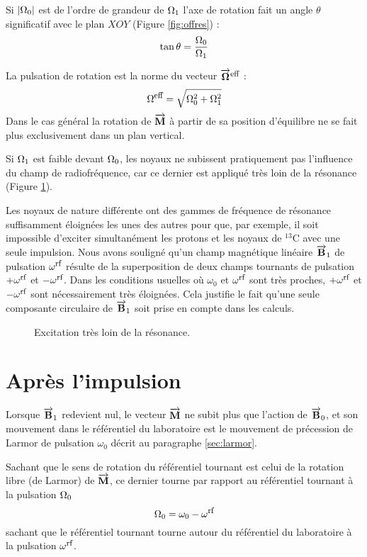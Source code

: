 Si $|\Omega_0|$
 est de l'ordre de grandeur de $\Omega_1$
l'axe de rotation fait un angle $\theta$ significatif avec le plan
$XOY$ (Figure \ref{fig:offres}) :
\begin{equation}
\tan \theta =  \frac{\Omega_0}{\Omega_1}
\end{equation}

La pulsation de rotation est la norme du vecteur $\overrightarrow{\mathbf{\Omega}}^{\mbox{\footnotesize{eff}}}$ :
\begin{equation}
\Omega^{\mbox{\footnotesize{eff}}} = \sqrt{\Omega_0^2 + \Omega_1^2}
\end{equation}
Dans le cas général la rotation de $\overrightarrow{\mathbf{M}}$ à partir de sa position d'équilibre
ne se fait plus exclusivement dans un plan vertical.

Si $\Omega_1$ est faible devant $\Omega_0$,
les noyaux ne subissent pratiquement pas l'influence du champ de
radiofréquence, car ce dernier est appliqué très loin de la résonance
(Figure \ref{fig:veryoffres}).

Les noyaux de nature différente ont des gammes de fréquence de résonance
suffisamment éloignées les unes des autres pour que, par exemple, il soit impossible
d'exciter simultanément les protons et les noyaux de $^{13}$C avec une seule
impulsion.
Nous avons souligné qu'un champ magnétique linéaire $\overrightarrow{\mathbf{B}}_1$ de pulsation $\omega^{\mbox{\footnotesize{rf}}}$
résulte de la superposition de deux champs tournants de pulsation $+\omega^{\mbox{\footnotesize{rf}}}$ et $-\omega^{\mbox{\footnotesize{rf}}}$.
Dans les conditions usuelles où $\omega_0$ et $\omega^{\mbox{\footnotesize{rf}}}$ sont très proches,
$+\omega^{\mbox{\footnotesize{rf}}}$ et $-\omega^{\mbox{\footnotesize{rf}}}$ sont nécessairement très
éloignées.
Cela justifie le fait qu'une seule composante
circulaire de $\overrightarrow{\mathbf{B}}_1$ soit prise en compte dans les calculs.

\begin{figure}[hbt]
\begin{center}
\end{center}
\caption{Excitation très loin de la résonance.}
\label{fig:veryoffres}
\end{figure}

\section{Après l'impulsion}
Lorsque $\overrightarrow{\mathbf{B}}_1$ redevient nul, le vecteur $\overrightarrow{\mathbf{M}}$ ne subit plus que l'action de
$\overrightarrow{\mathbf{B}}_0$, et son mouvement dans le référentiel du laboratoire est le mouvement
de précession de Larmor de pulsation $\omega_0$ décrit au paragraphe \ref{sec:larmor}.

Sachant que le sens de rotation du référentiel tournant est celui de la
rotation libre (de Larmor) de $\overrightarrow{\mathbf{M}}$,
ce dernier tourne par rapport au référentiel tournant à la pulsation $\Omega_0$
\begin{equation}
\Omega_0 = \omega_0 - \omega^{\mbox{\footnotesize{rf}}}
\end{equation}
sachant que le référentiel tournant tourne autour du référentiel du laboratoire
à la pulsation $\omega^{\mbox{\footnotesize{rf}}}$.

